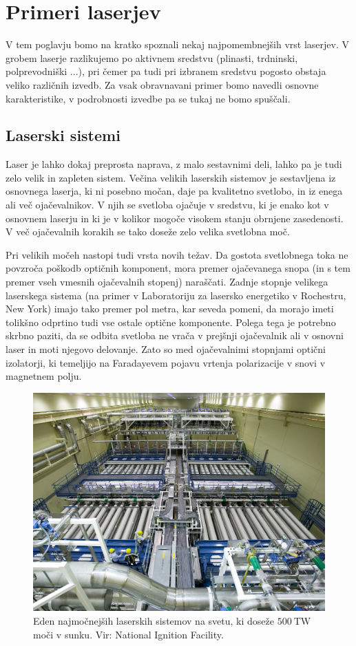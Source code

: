 \chapter{Primeri laserjev}
\label{chap:Primeri}
V tem poglavju bomo na kratko spoznali nekaj najpomembnejših vrst laserjev.
V grobem laserje razlikujemo po aktivnem sredstvu 
(plinasti, trdninski, polprevodniški ...), pri čemer pa tudi pri izbranem
sredstvu pogosto obstaja veliko različnih izvedb. Za vsak obravnavani primer bomo 
navedli osnovne karakteristike, v podrobnosti izvedbe pa se tukaj ne bomo 
spuščali. 

\section{Laserski sistemi}
Laser je lahko dokaj preprosta naprava, z malo sestavnimi deli, lahko pa je
tudi zelo velik in zapleten sistem. Večina velikih laserskih sistemov
je sestavljena iz osnovnega laserja, ki ni posebno močan, daje pa kvalitetno 
svetlobo, in iz enega ali več ojačevalnikov. V njih se svetloba 
ojačuje v sredstvu, ki je enako kot v
osnovnem laserju in ki je v kolikor mogoče visokem stanju obrnjene
zasedenosti. V več ojačevalnih korakih se tako doseže zelo velika 
svetlobna moč. 

Pri velikih močeh nastopi tudi vrsta novih težav. Da gostota 
svetlobnega toka ne povzroča poškodb optičnih komponent, mora 
premer ojačevanega snopa (in s tem premer vseh vmesnih ojačevalnih stopenj) 
naraščati. Zadnje stopnje velikega laserskega sistema
(na primer v Laboratoriju za lasersko energetiko v Rochestru, New York) imajo 
tako premer pol metra, kar seveda pomeni, da morajo imeti tolikšno odprtino 
tudi vse ostale optične komponente. Polega tega je
potrebno skrbno paziti, da se odbita svetloba ne vrača v prejšnji
ojačevalnik ali v osnovni laser in moti njegovo delovanje. Zato so med
ojačevalnimi stopnjami optični izolatorji, ki temeljijo na Faradayevem
pojavu vrtenja polarizacije v snovi v magnetnem polju.

\begin{figure}[h!]
\centering
\includegraphics[width=100truemm]{slike/07_NIF_Laser_Bay.jpg}
\caption{Eden najmočnejših laserskih sistemov na svetu, ki doseže 
$500~\si{\tera\watt}$ moči v sunku. Vir: National Ignition Facility.}
\label{fig:NIF}
\end{figure}


